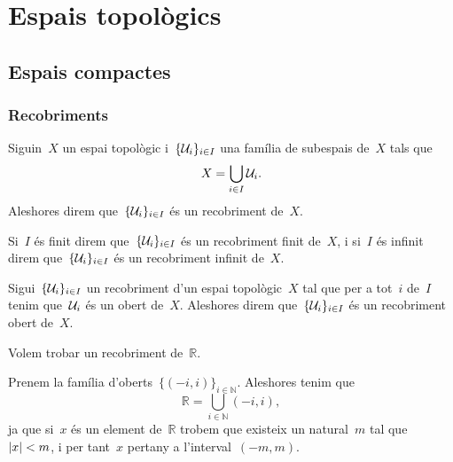 \documentclass[../topologia.tex]{subfiles}
\begin{document}
\chapter{Espais topològics}
\section{Espais compactes}
    \subsection{Recobriments}
    \begin{definition}[Recobriment]
        \label{def:recobriment-dun-espai}
        \label{def:recobriment-finit-dun-espai}
        \label{def:recobriment-infinit-dun-espai}
        Siguin~\(X\) un espai topològic i~\(\{\mathcal{U}_{i}\}_{i\in I}\) una família de subespais de~\(X\) tals que
        \[
            X=\bigcup_{i\in I}\mathcal{U}_{i}.
        \]
        Aleshores direm que~\(\{\mathcal{U}_{i}\}_{i\in I}\) és un recobriment de~\(X\).

        Si~\(I\) és finit direm que~\(\{\mathcal{U}_{i}\}_{i\in I}\) és un recobriment finit de~\(X\), i si~\(I\) és infinit direm que~\(\{\mathcal{U}_{i}\}_{i\in I}\) és un recobriment infinit de~\(X\).
    \end{definition}
    \begin{definition}
        \label{def:recobriment-obert}
        Sigui~\(\{\mathcal{U}_{i}\}_{i\in I}\) un recobriment d'un espai topològic~\(X\) tal que per a tot~\(i\) de~\(I\) tenim que~\(\mathcal{U}_{i}\) és un obert de~\(X\).
        Aleshores direm que~\(\{\mathcal{U}_{i}\}_{i\in I}\) és un recobriment obert de~\(X\).
    \end{definition}
    \begin{example}
        \label{ex:un-recobriment-obert-de-R}
        Volem trobar un recobriment de~\(\mathbb{R}\).
    \end{example}
    \begin{solution}
        Prenem la família d'oberts~\(\{(-i,i)\}_{i\in\mathbb{N}}\).
        Aleshores tenim que
        \[
            \mathbb{R}=\bigcup_{i\in\mathbb{N}}(-i,i),
        \]
        ja que si~\(x\) és un element de~\(\mathbb{R}\) trobem que existeix un natural~\(m\) tal que~\(\abs{x}<m\), i per tant~\(x\) pertany a l'interval~\((-m,m)\).
    \end{solution}
\end{document}
